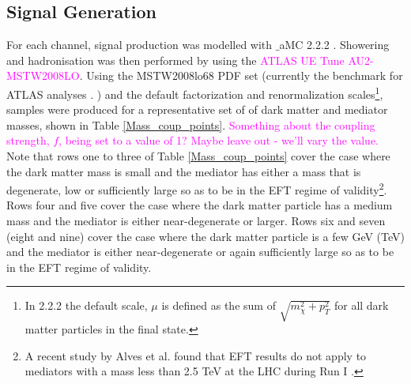 \subsection{Signal Generation}
\label{signal_generation}
\begin{flushleft}

For each channel, signal production was modelled with $\_$aMC 2.2.2 . Showering and hadronisation was then performed by  using the \textcolor{magenta}{ATLAS UE Tune AU2-MSTW2008LO}. Using the MSTW2008lo68 PDF set (currently the benchmark for ATLAS analyses \cite{}. ) and the default \MG factorization and renormalization scales\footnote{In  2.2.2 the default scale, $\mu$ is defined as the sum of $\sqrt{m_{\chi}^{2} + p_{T}^{2}}$ for all dark matter particles in the final state.}, samples were produced for a representative set of of dark matter and mediator masses, shown in Table \ref{Mass_coup_points}. \textcolor{magenta}{Something about the coupling strength, $f$, being set to a value of 1? Maybe leave out - we'll vary the value.} Note that rows one to three of Table \ref{Mass_coup_points} cover the case where the dark matter mass is small and the mediator has either a mass that is degenerate, low or sufficiently large so as to be in the EFT regime of validity\footnote{A recent study by Alves et al. found that EFT results do not apply to mediators with a mass less than 2.5 TeV at the LHC during Run I \cite{Alves:2011wf}.}. Rows four and five cover the case where the dark matter particle has a medium mass and the mediator is either near-degenerate or larger. Rows six and seven (eight and nine) cover the case where the dark matter particle is a few GeV (TeV) and the mediator is either near-degenerate or again sufficiently large so as to be in the EFT regime of validity. 


\end{flushleft}
